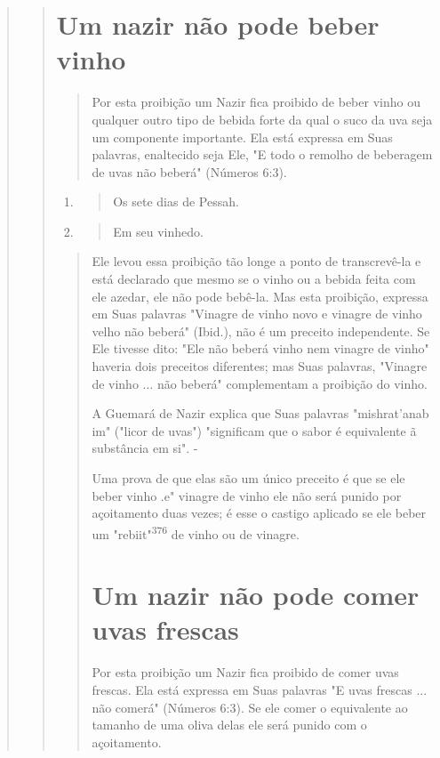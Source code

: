 \begin{quote}
\begin{quote}
\section{Um nazir não pode beber vinho}

\begin{quote}
Por esta proibição um Nazir fica proibido de beber vinho ou qual­quer
outro tipo de bebida forte da qual o suco da uva seja um componente
importante. Ela está expressa em Suas palavras, enaltecido seja Ele, "E
todo o remolho de beberagem de uvas não beberá" (Números 6:3).
\end{quote}

\begin{enumerate}
\def\labelenumi{\arabic{enumi}.}
\setcounter{enumi}{373}
\item
 \begin{quote}
 Os sete dias de Pessah.
 \end{quote}
\item
 \begin{quote}
 Em seu vinhedo.
 \end{quote}
\end{enumerate}

\begin{quote}Ele levou essa proibição tão longe a ponto de transcrevê-la e está
declarado que mesmo se o vinho ou a bebida feita com ele azedar, ele não
po­de bebê-la. Mas esta proibição, expressa em Suas palavras "Vinagre de
vinho novo e vinagre de vinho velho não beberá" (Ibid.), não é um
preceito indepen­dente. Se Ele tivesse dito: "Ele não beberá vinho nem
vinagre de vinho" have­ria dois preceitos diferentes; mas Suas palavras,
"Vinagre de vinho ... não be­berá" complementam a proibição do vinho.

A Guemará de Nazir explica que Suas palavras "mishrat'anab im" ("li­cor
de uvas") "significam que o sabor é equivalente ã substância em si". -

Uma prova de que elas são um único preceito é que se ele beber vi­nho
.e" vinagre de vinho ele não será punido por
açoitamento duas vezes; é esse o castigo aplicado se ele beber um
"rebiit"\textsuperscript{376} de vinho ou de vinagre.

\section{Um nazir não pode comer uvas frescas}

Por esta proibição um Nazir fica proibido de comer uvas frescas. Ela
está expressa em Suas palavras "E uvas frescas ... não comerá" (Números
6:3). Se ele comer o equivalente ao tamanho de uma oliva delas ele será
punido com o açoitamento.


\end{quote}
\end{quote}
\end{quote}
